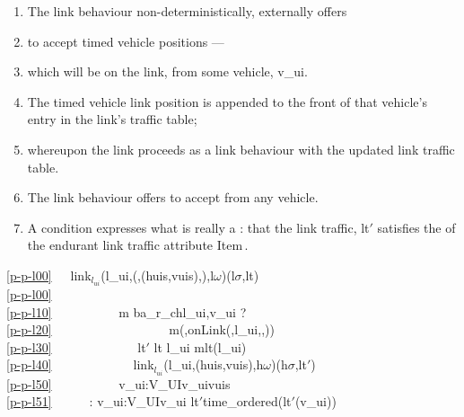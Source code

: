 {


\begin{enumerate}\setei
\item \label{p-p-l00} The link behaviour non-deterministically, externally
                    offers 
\item \label{p-p-l10} to accept timed vehicle positions ---
\item \label{p-p-l20} which will be on the link, from some vehicle,
                    \textsf{v\_ui}.  
\item \label{p-p-l30} The timed vehicle link position is appended to the
                    front of that vehicle's entry in the link's traffic
                    table; 
\item \label{p-p-l40} whereupon the link proceeds as a link behaviour with 
                    the updated link traffic table.
\item \label{p-p-l50} The link behaviour offers to accept from any vehicle.
\item \label{p-p-l51} A  condition expresses what is really a
                    : that the \textsf{link
                    traffic, lt$'$} satisfies the  of the
                    endurant link traffic attribute Item\,. 
\savei\end{enumerate}
\bp
\ref{p-p-l00}\ \ \ link$_{l_{ui}}$(l\_ui,({\UNDERLINE},(huis,vuis),{\UNDERLINE}),l$\omega$)(l$\sigma$,lt) {\IS}\\
\ref{p-p-l00}\ \ \ \ \ \ {\DETCHOICE} \\
\ref{p-p-l10}\ \ \ \ \ \ \ \ \ \ {\LBRACE}  m {\EQ} ba\_r\_ch{\LBRACKET}l\_ui,v\_ui{\RBRACKET} ? \ \ \\
\ref{p-p-l20}\ \ \ \ \ \ \ \ \ \ \ \ \ \ \ \ \ \  m{\EQ}({\UNDERLINE},onLink({\UNDERLINE},l\_ui,{\UNDERLINE},{\UNDERLINE}))\\
\ref{p-p-l30}\ \ \ \ \ \ \ \ \ \ \ \ \  lt$'$ {\EQ} lt {\DAGGER} {\LBRACKET}l\_ui {\MAPSTO} {\LANGLE}m{\RANGLE}{\CONCAT}lt(l\_ui){\RBRACKET} \\
\ref{p-p-l40}\ \ \ \ \ \ \ \ \ \ \ \ \ link$_{l_{ui}}$(l\_ui,(huis,vuis),h$\omega$)(h$\sigma$,lt$'$)\\
\ref{p-p-l50}\ \ \ \ \ \ \ \ \ \ {\BAR} v\_ui:V\_UI{\RDOT}v\_ui{\ISIN}vuis   {\RBRACE}\\
\ref{p-p-l51}\ \ \ \ \ \ : {\ALL} v\_ui:V\_UI{\RDOT}v\_ui {\ISIN}  lt$'${\DBLRIGHTARROW}time\_ordered(lt$'$(v\_ui))\ \ \ \ \ \ \ \ \ \ \ 
\ep

}
